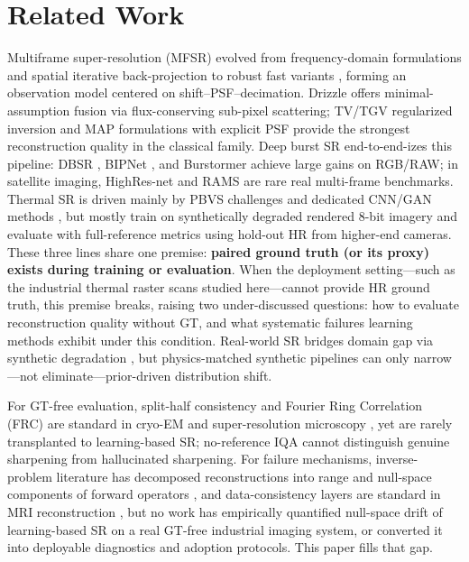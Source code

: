 \section{Related Work}

Multiframe super-resolution (MFSR) evolved from frequency-domain formulations
\citep{tsai1984multiframe} and spatial iterative back-projection
\citep{irani1991improving} to robust fast variants \citep{farsiu2004fast},
forming an observation model centered on shift--PSF--decimation. Drizzle
\citep{fruchter2002drizzle} offers minimal-assumption fusion via flux-conserving
sub-pixel scattering; TV/TGV regularized inversion
\citep{rudin1992nonlinear,bredies2010tgv} and MAP formulations with explicit PSF
\citep{elad1997restoration,hardie1997joint} provide the strongest reconstruction
quality in the classical family. Deep burst SR end-to-end-izes this pipeline: DBSR
\citep{bhat2021deep}, BIPNet \citep{dudhane2022burst}, and Burstormer
\citep{dudhane2023burstormer} achieve large gains on RGB/RAW; in satellite imaging,
HighRes-net and RAMS \citep{deudon2020highres,salvetti2020rams} are rare real
multi-frame benchmarks. Thermal SR is driven mainly by PBVS challenges
\citep{rivadeneira2020thermal,rivadeneira2023thermal} and dedicated CNN/GAN methods
\citep{chudasama2020therisurnet,rivadeneira2020novel}, but mostly train on
synthetically degraded rendered 8-bit imagery and evaluate with full-reference
metrics using hold-out HR from higher-end cameras. These three lines share one
premise: \textbf{paired ground truth (or its proxy) exists during training or
evaluation}. When the deployment setting---such as the industrial thermal raster
scans studied here---cannot provide HR ground truth, this premise breaks, raising
two under-discussed questions: how to evaluate reconstruction quality without GT,
and what systematic failures learning methods exhibit under this condition.
Real-world SR bridges domain gap via synthetic degradation
\citep{bellkligler2019blind,wang2021real,zhang2021designing}, but physics-matched
synthetic pipelines can only narrow---not eliminate---prior-driven distribution
shift.

For GT-free evaluation, split-half consistency and Fourier Ring Correlation (FRC)
are standard in cryo-EM and super-resolution microscopy
\citep{vanheel2005fourier,nieuwenhuizen2013measuring,banterle2013fourier}, yet are
rarely transplanted to learning-based SR; no-reference IQA
\citep{mittal2013making} cannot distinguish genuine sharpening from hallucinated
sharpening. For failure mechanisms, inverse-problem literature has decomposed
reconstructions into range and null-space components of forward operators
\citep{schwab2019deep,chen2021equivariant,ulyanov2018deep,heckel2019deep}, and
data-consistency layers are standard in MRI reconstruction
\citep{schlemper2018deep}, but no work has empirically quantified null-space drift
of learning-based SR on a real GT-free industrial imaging system, or converted it
into deployable diagnostics and adoption protocols. This paper fills that gap.
